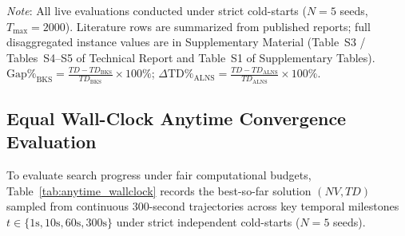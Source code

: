 \documentclass{ieeeaccess}
\begin{document}
\begin{table}[!t]
{\vspace{1mm}
\textit{Note}: All live evaluations conducted under strict cold-starts ($N=5$ seeds, $T_{\max}=2000$). Literature rows are summarized from published reports; full disaggregated instance values are in Supplementary Material (Table~S3 / Tables~S4--S5 of Technical Report and Table~S1 of Supplementary Tables). $\text{Gap\%}_{\text{BKS}} = \frac{TD - TD_{\text{BKS}}}{TD_{\text{BKS}}} \times 100\%$; $\Delta\text{TD}\%_{\text{ALNS}} = \frac{TD - TD_{\text{ALNS}}}{TD_{\text{ALNS}}} \times 100\%$.\par}
\end{table}

\subsection{Equal Wall-Clock Anytime Convergence Evaluation}
\label{sec:anytime_results}

To evaluate search progress under fair computational budgets, Table~\ref{tab:anytime_wallclock} records the best-so-far solution $(NV, TD)$ sampled from continuous 300-second trajectories across key temporal milestones $t \in \{1\text{s}, 10\text{s}, 60\text{s}, 300\text{s}\}$ under strict independent cold-starts ($N=5$ seeds).
\end{document}
